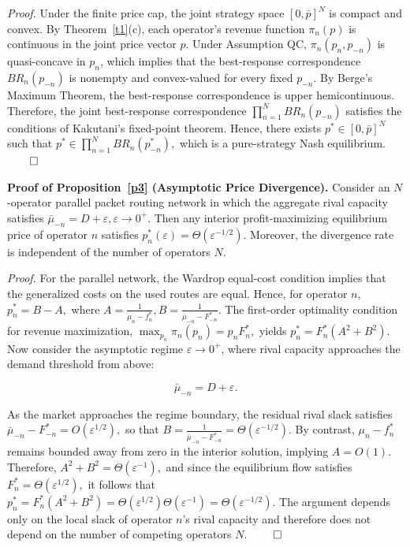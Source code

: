 \documentclass[review,3p,authoryear]{elsarticle}
\begin{document}
\medskip\noindent\textit{Proof.} Under the finite price cap, the joint strategy space $[0, \bar{p}]^{N}$ is compact and convex. By Theorem~\ref{t1}(c), each operator's revenue function ${\pi}_{n}(p)$ is continuous in the joint price vector $p$. Under Assumption QC, ${\pi}_{n}(p_{n},p_{-n})$ is quasi-concave in $p_{n}$, which implies that the best-response correspondence $BR_{n}(p_{-n})$ is nonempty and convex-valued for every fixed $p_{-n}$. By Berge's Maximum Theorem, the best-response correspondence is upper hemicontinuous. Therefore, the joint best-response correspondence $\prod_{n=1}^{N} BR_{n}(p_{-n})$ satisfies the conditions of Kakutani's fixed-point theorem. Hence, there exists $p^{*}{\in}[0,\bar{p}]^{N}$ such that $p^{*}{\in}\prod_{n=1}^{N} BR_{n}(p_{-n}^{*}),$ which is a pure-strategy Nash equilibrium. $\qed$

\medskip\noindent\textbf{Proof of Proposition~\ref{p3} (Asymptotic Price Divergence).}
Consider an $N$-operator parallel packet routing network in which the aggregate rival capacity satisfies $\bar{{\mu}}_{-n}=D+{\varepsilon},{\varepsilon}{\to}0^{+}.$ Then any interior profit-maximizing equilibrium price of operator $n$ satisfies $p_{n}^{*}({\varepsilon})={\Theta}({\varepsilon}^{-1/2}).$ Moreover, the divergence rate is independent of the number of operators $N$.

\medskip\noindent\textit{Proof.} For the parallel network, the Wardrop equal-cost condition implies that the generalized costs on the used routes are equal. Hence, for operator $n$, $p_{n}^{*}=B-A,$ where $A=\frac{1}{{\mu}_{n}-f_{n}^{*}},B=\frac{1}{\bar{{\mu}}_{-n}-F_{-n}^{*}}.$ The first-order optimality condition for revenue maximization, $\max_{p_{n}} {\pi}_{n}(p_{n})=p_{n}F_{n}^{*},$ yields $p_{n}^{*}=F_{n}^{*}(A^{2}+B^{2}).$ Now consider the asymptotic regime ${\varepsilon}{\to}0^{+}$, where rival capacity approaches the demand threshold from above:

\begin{equation}
\bar{{\mu}}_{-n}=D+{\varepsilon}.
\end{equation}

As the market approaches the regime boundary, the residual rival slack satisfies $\bar{{\mu}}_{-n}-F_{-n}^{*}=O({\varepsilon}^{1/2}),$ so that $B=\frac{1}{\bar{{\mu}}_{-n}-F_{-n}^{*}}={\Theta}({\varepsilon}^{-1/2}).$ By contrast, ${\mu}_{n}-f_{n}^{*}$ remains bounded away from zero in the interior solution, implying $A=O(1).$ Therefore, $A^{2}+B^{2}={\Theta}({\varepsilon}^{-1}),$ and since the equilibrium flow satisfies $F_{n}^{*}={\Theta}({\varepsilon}^{1/2}),$ it follows that $p_{n}^{*}=F_{n}^{*}(A^{2}+B^{2})={\Theta}({\varepsilon}^{1/2}){\Theta}({\varepsilon}^{-1})={\Theta}({\varepsilon}^{-1/2}).$ The argument depends only on the local slack of operator $n$'s rival capacity and therefore does not depend on the number of competing operators $N$. $\qed$
\end{document}
